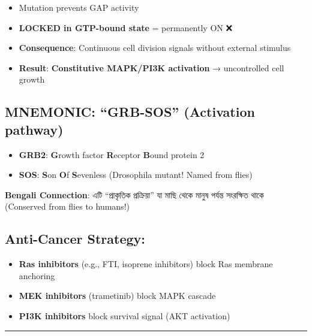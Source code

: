 \begin{itemize}
\tightlist
\item
  Mutation prevents GAP activity
\item
  \textbf{LOCKED in GTP-bound state} = permanently ON ❌
\item
  \textbf{Consequence}: Continuous cell division signals without
  external stimulus
\item
  \textbf{Result}: \textbf{Constitutive MAPK/PI3K activation} →
  uncontrolled cell growth
\end{itemize}

\hypertarget{mnemonic-grb-sos-activation-pathway}{%
\subsection{\texorpdfstring{\textbf{MNEMONIC: ``GRB-SOS'' (Activation
pathway)}}{MNEMONIC: ``GRB-SOS'' (Activation pathway)}}\label{mnemonic-grb-sos-activation-pathway}}

\begin{itemize}
\tightlist
\item
  \textbf{GRB2}: \textbf{G}rowth factor \textbf{R}eceptor \textbf{B}ound
  protein 2
\item
  \textbf{SOS}: \textbf{S}on \textbf{O}f \textbf{S}evenless (Drosophila
  mutant! Named from flies)
\end{itemize}

\textbf{Bengali Connection}: এটি ``প্রাকৃতিক প্রক্রিয়া'' যা মাছি থেকে মানুষ
পর্যন্ত সংরক্ষিত থাকে (Conserved from flies to humans!)

\hypertarget{anti-cancer-strategy}{%
\subsection{\texorpdfstring{\textbf{Anti-Cancer
Strategy}:}{Anti-Cancer Strategy:}}\label{anti-cancer-strategy}}

\begin{itemize}
\tightlist
\item
  \textbf{Ras inhibitors} (e.g., FTI, isoprene inhibitors) block Ras
  membrane anchoring
\item
  \textbf{MEK inhibitors} (trametinib) block MAPK cascade
\item
  \textbf{PI3K inhibitors} block survival signal (AKT activation)
\end{itemize}

\begin{center}\rule{0.5\linewidth}{0.5pt}\end{center}

